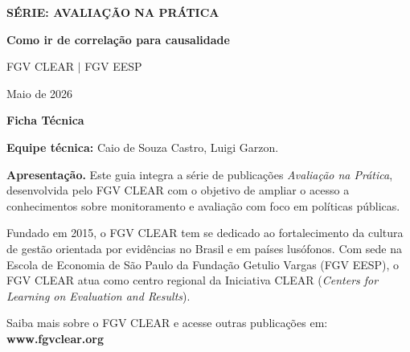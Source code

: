 \documentclass[12pt, a4paper, openany]{book}
\numberwithin{equation}{chapter}
\numberwithin{table}{chapter}
\numberwithin{figure}{chapter}
\begin{document}
\frontmatter

\thispagestyle{empty}
\begin{center}
\vspace*{3cm}

{\Large\bfseries\color{clearlightblue} S\'ERIE: AVALIA\c{C}\~AO NA PR\'ATICA}

\vspace{1.8cm}

{\Huge\bfseries\color{clearblue} Como ir de correlação para causalidade }

\vspace{2.2cm}

{\large FGV CLEAR $|$ FGV EESP}

\vspace{0.5cm}

{\large Maio de 2026}

\vfill
\end{center}
\newpage

\thispagestyle{empty}
\vspace*{1.5cm}

{\Large\bfseries\color{clearblue} Ficha T\'ecnica}

\bigskip

\noindent\textbf{Equipe t\'ecnica:} Caio de Souza Castro, Luigi Garzon.

\bigskip

\noindent\textbf{Apresenta\c{c}\~ao.} Este guia integra a s\'erie de publica\c{c}\~oes \textit{Avalia\c{c}\~ao na Pr\'atica}, desenvolvida pelo FGV CLEAR com o objetivo de ampliar o acesso a conhecimentos sobre monitoramento e avalia\c{c}\~ao com foco em pol\'iticas p\'ublicas.

\medskip

\noindent Fundado em 2015, o FGV CLEAR tem se dedicado ao fortalecimento da cultura de gest\~ao orientada por evid\^encias no Brasil e em pa\'ises lus\'ofonos. Com sede na Escola de Economia de S\~ao Paulo da Funda\c{c}\~ao Getulio Vargas (FGV EESP), o FGV CLEAR atua como centro regional da Iniciativa CLEAR (\textit{Centers for Learning on Evaluation and Results}).

\medskip

\noindent Saiba mais sobre o FGV CLEAR e acesse outras publica\c{c}\~oes em: \textbf{www.fgvclear.org}
\end{document}
